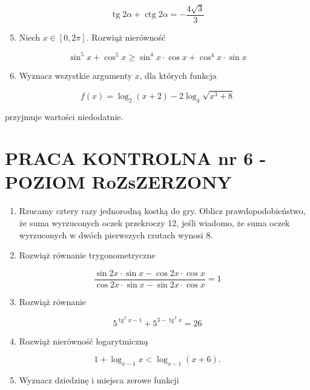 \documentclass[10pt]{article}
\begin{document}
$$
\operatorname{tg} 2 \alpha+\operatorname{ctg} 2 \alpha=-\frac{4 \sqrt{3}}{3}
$$

\begin{enumerate}
  \setcounter{enumi}{4}
  \item Niech $x \in[0,2 \pi]$. Rozwiąż nierówność
\end{enumerate}

$$
\sin ^{5} x+\cos ^{5} x \geqslant \sin ^{4} x \cdot \cos x+\cos ^{4} x \cdot \sin x
$$

\begin{enumerate}
  \setcounter{enumi}{5}
  \item Wyznacz wszystkie argumenty $x$, dla których funkcja
\end{enumerate}

$$
f(x)=\log _{2}(x+2)-2 \log _{4} \sqrt{x^{3}+8}
$$

przyjmuje wartości niedodatnie.

\section*{PRACA KONTROLNA nr 6 - POZIOM RoZsZERZONY}
\begin{enumerate}
  \item Rzucamy cztery razy jednorodną kostką do gry. Oblicz prawdopodobieństwo, że suma wyrzuconych oczek przekroczy 12, jeśli wiadomo, że suma oczek wyrzuconych w dwóch pierwszych rzutach wynosi 8.
  \item Rozwiąż równanie trygonometryczne
\end{enumerate}

$$
\frac{\sin 2 x \cdot \sin x-\cos 2 x \cdot \cos x}{\cos 2 x \cdot \sin x-\sin 2 x \cdot \cos x}=1
$$

\begin{enumerate}
  \setcounter{enumi}{2}
  \item Rozwiąż równanie
\end{enumerate}

$$
5^{\operatorname{tg}^{2} x-1}+5^{3-\operatorname{tg}^{2} x}=26
$$

\begin{enumerate}
  \setcounter{enumi}{3}
  \item Rozwiąż nierówność logarytmiczną
\end{enumerate}

$$
1+\log _{x-1} x<\log _{x-1}(x+6) .
$$

\begin{enumerate}
  \setcounter{enumi}{4}
  \item Wyznacz dziedzinę i miejsca zerowe funkcji
\end{enumerate}
\end{document}

